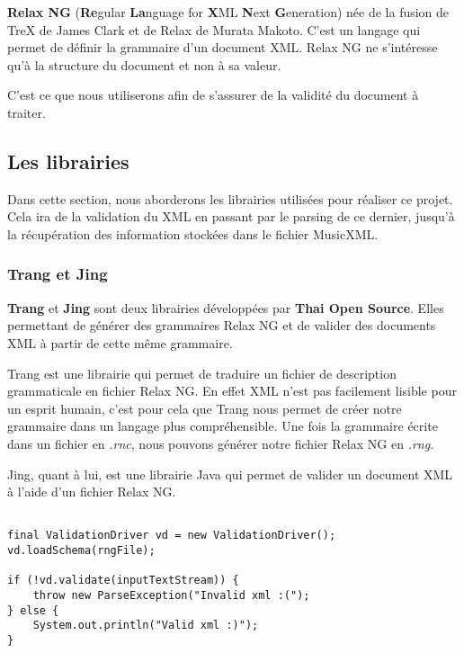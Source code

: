 \textbf{Relax NG} (\textbf{Re}gular \textbf{La}nguage for \textbf{X}ML \textbf{N}ext \textbf{G}eneration) \cite{relaxng} née de la fusion de TreX de James Clark et de Relax de Murata Makoto. C'est un langage qui permet de définir la grammaire d'un document XML. Relax NG ne s'intéresse qu'à la structure du document et non à sa valeur.

\par
C'est ce que nous utiliserons afin de s'assurer de la validité du document à traiter.


\subsection{Les librairies}

Dans cette section, nous aborderons les librairies utilisées pour réaliser ce projet. Cela ira de la validation du XML en passant par le parsing de ce dernier, jusqu'à la récupération des information stockées dans le fichier MusicXML.


\subsubsection{Trang et Jing}

\textbf{Trang} \cite{trang} et \textbf{Jing} \cite{jing} sont deux librairies développées par \textbf{Thai Open Source}. Elles permettant de générer des grammaires Relax NG et de valider des documents XML à partir de cette même grammaire.

\par
Trang est une librairie qui permet de traduire un fichier de description grammaticale en fichier Relax NG. En effet XML n'est pas facilement lisible pour un esprit humain, c'est pour cela que Trang nous permet de créer notre grammaire dans un langage plus compréhensible. Une fois la grammaire écrite dans un fichier en \emph{.rnc}, nous pouvons générer notre fichier Relax NG en \emph{.rng}.

\par
Jing, quant à lui, est une librairie Java qui permet de valider un document XML à l'aide d'un fichier Relax NG.


\begin{lstlisting}[caption=Code java permettant de vérifier la validation d'un document XML]

final ValidationDriver vd = new ValidationDriver();
vd.loadSchema(rngFile);

if (!vd.validate(inputTextStream)) {
	throw new ParseException("Invalid xml :(");
} else {
    System.out.println("Valid xml :)");
}
\end{lstlisting}

